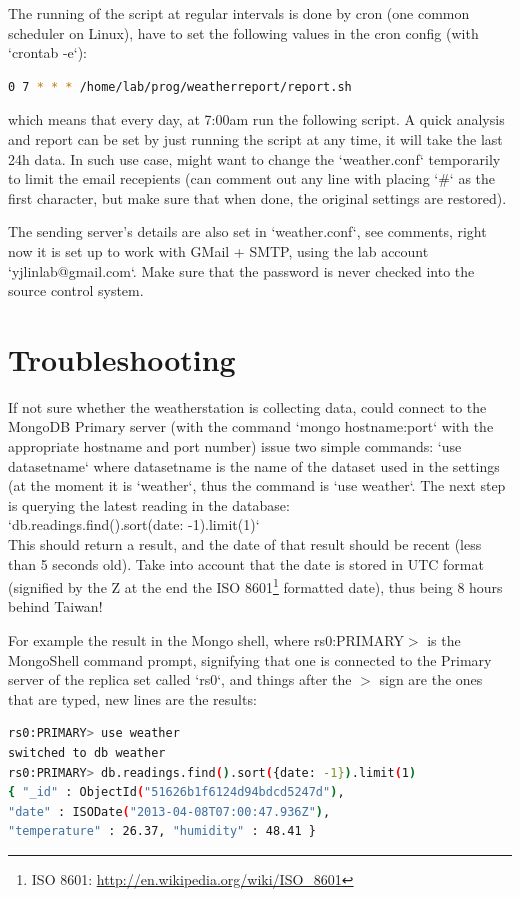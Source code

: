 \documentclass[12pt,a4paper]{article}
\begin{document}
The running of the script at regular intervals is done by cron (one common scheduler on Linux), have to set the following values in the cron config (with `crontab -e`):
\begin{lstlisting}[language=Bash,frame=single]
0 7 * * * /home/lab/prog/weatherreport/report.sh
\end{lstlisting}
which means that every day, at 7:00am run the following script. A quick analysis and report can be set by just running the script at any time, it will take the last 24h data. In such use case, might want to change the `weather.conf` temporarily to limit the email recepients (can comment out any line with placing `\#` as the first character, but make sure that when done, the original settings are restored).

The sending server's details are also set in `weather.conf`, see comments, right now it is set up to work with GMail + SMTP, using the lab account `yjlinlab@gmail.com`. Make sure that the password is never checked into the source control system.

\section{Troubleshooting}

If not sure whether the weatherstation is collecting data, could connect to the MongoDB Primary server (with the command `mongo hostname:port` with the appropriate hostname and port number) issue two simple commands: `use datasetname` where datasetname is the name of the dataset used in the settings (at the moment it is `weather`, thus the command is `use weather`. The next step is querying the latest reading in the database: \\`db.readings.find().sort({date: -1}).limit(1)`\\
This should return a result, and the date of that result should be recent (less than 5 seconds old). Take into account that the date is stored in UTC format (signified by the Z at the end the ISO 8601\footnote{ISO 8601: \url{http://en.wikipedia.org/wiki/ISO_8601}} formatted date), thus being 8 hours behind Taiwan!

For example the result in the Mongo shell, where rs0:PRIMARY$>$ is the MongoShell command prompt, signifying that one is connected to the Primary server of the replica set called `rs0`, and things after the $>$ sign are the ones that are typed, new lines are the results:
\begin{lstlisting}[language=sh,frame=single]
rs0:PRIMARY> use weather
switched to db weather
rs0:PRIMARY> db.readings.find().sort({date: -1}).limit(1)
{ "_id" : ObjectId("51626b1f6124d94bdcd5247d"),
"date" : ISODate("2013-04-08T07:00:47.936Z"),
"temperature" : 26.37, "humidity" : 48.41 }
\end{lstlisting}
\end{document}

